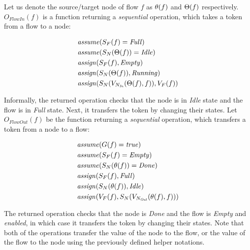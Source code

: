 \begin{definition}	
	Let us denote the source/target node of flow \(f\) as \( \theta(f) \) and \( \Theta(f) \) respectively. \(O_\mathit{FlowIn}(f)\) is a function returning a \emph{sequential} operation, which takes a token from a flow to a node:
	
	\begin{align*}
		&\mathit{assume}(S_F(f) = \mathit{Full}) \\
		&\mathit{assume}(S_N(\Theta(f)) = \mathit{Idle}) \\
		&\mathit{assign}(S_F(f), \mathit{Empty}) \\
		&\mathit{assign}(S_N(\Theta(f)), \mathit{Running}) \\
		&\mathit{assign}(S_N(V_{N_\mathit{In}}(\Theta(f), f)), V_F(f)) \\
	\end{align*}

	Informally, the returned operation checks that the node is in \emph{Idle} state and the flow is in \emph{Full} state. Next, it transfers the token by changing their states. Let \(O_\mathit{FlowOut}(f)\) be the function returning a \emph{sequential} operation, which transfers a token from a node to a flow:
	
	\begin{align*}
		&\mathit{assume}(G(f) = \mathit{true}) \\
		&\mathit{assume}(S_F(f) = \mathit{Empty}) \\
		&\mathit{assume}(S_N(\theta(f)) = \mathit{Done}) \\
		&\mathit{assign}(S_F(f), \mathit{Full}) \\
		&\mathit{assign}(S_N(\theta(f)), \mathit{Idle}) \\
		&\mathit{assign}(V_F(f), S_N(V_{N_\mathit{Out}}(\theta(f), f))) \\
	\end{align*}

	The returned operation checks that the node is \emph{Done} and the flow is \emph{Empty} and \emph{enabled}, in which case it transfers the token by changing their states. Note that both of the operations transfer the value of the node to the flow, or the value of the flow to the node using the previously defined helper notations.
\end{definition}

